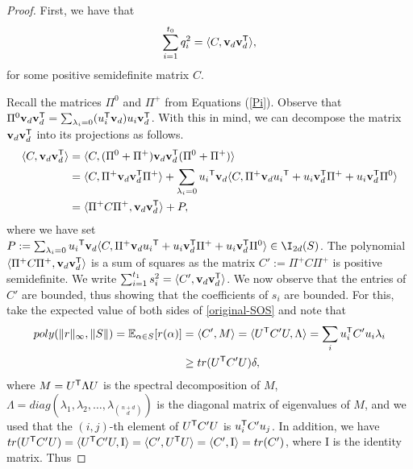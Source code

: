 \documentclass[11pt]{article}
\begin{document}
\begin{proof}
    First, we have that
    \begin{equation}
        \sum_{i=1}^{t_0} q_i^2 = \langle C, \mathbf{v}_d \mathbf{v}_d^{\sf{T}} \rangle,
    \end{equation}
    for some positive semidefinite matrix $C$.
    
    Recall the matrices $\Pi^0$ and $\Pi^+$ from Equations (\ref{Pi}). Observe that $\Pi^0 \mathbf{v}_d \mathbf{v}_d^{\sf{T}} = \sum_{\lambda_i = 0} (u_i^{\sf{T}} \mathbf{v}_d ) u_i \mathbf{v}_d^{\sf{T}}$. With this in mind, we can decompose the matrix $\mathbf{v}_d \mathbf{v}_d^{\sf{T}}$ into its projections as follows.
    \begin{align*}
        \langle C, \mathbf{v}_d \mathbf{v}_d^{\sf{T}} \rangle &= \langle C, (\Pi^0 + \Pi^+) \mathbf{v}_d \mathbf{v}_d^{\sf{T}} (\Pi^0 + \Pi^+) \rangle \\
        &= \langle C, \Pi^+ \mathbf{v}_d \mathbf{v}_d^{\sf{T}} \Pi^+ \rangle + \sum_{\lambda_i = 0} {u_i}^{\sf{T}} \mathbf{v}_d \langle C, \Pi^+ \mathbf{v}_d {u_i}^{\sf{T}} + {u_i} \mathbf{v}_d^{\sf{T}} \Pi^+ + {u_i} \mathbf{v}_d^{\sf{T}} \Pi^0 \rangle\\
        & = \langle \Pi^+ C \Pi^+, \mathbf{v}_d \mathbf{v}_d^{\sf{T}} \rangle + P,
    \end{align*}
    where we have set $P := \sum_{\lambda_i = 0} {u_i}^{\sf{T}} \mathbf{v}_d \langle C, \Pi^+ \mathbf{v}_d {u_i}^{\sf{T}} + {u_i} \mathbf{v}_d^{\sf{T}} \Pi^+ + {u_i} \mathbf{v}_d^{\sf{T}} \Pi^0 \rangle \in \I_{2d}(S)$. The polynomial $\langle \Pi^+ C \Pi^+, \mathbf{v}_d \mathbf{v}_d^{\sf{T}} \rangle$ is a sum of squares as the matrix $C':= \Pi^+ C \Pi^+$ is positive semidefinite. We write $\sum_{i=1}^{t_1}s_i^2 = \langle  C', \mathbf{v}_d \mathbf{v}_d^{\sf{T}} \rangle $. We now observe that the entries of $C'$ are bounded, thus showing that the coefficients of $s_i$ are bounded. For this, take the expected value of both sides of \eqref{original-SOS} and note that
    \begin{align*}
        poly(\| r \|_{\infty}, \| S \|)=\mathbb{E}_{\alpha \in S} [r(\alpha)] &= \langle C', M \rangle = \langle U^{\sf{T}} C' U, \Lambda \rangle = \sum_i u_i^{\sf{T}} C' u_i \lambda_i\\
        &\geq tr(U^{\sf{T}} C' U) \delta,
    \end{align*}
    where $M = U^{\sf{T}} \Lambda U$ is the spectral decomposition of $M$, $\Lambda = diag(\lambda_1, \lambda_2, \dots, \lambda_{\binom{n+d}{d}})$ is the diagonal matrix of eigenvalues of $M$, and we used that the $(i,j)$-th element of $U^{\sf{T}} C' U$ is $u_i^{\sf{T}} C' u_j$. In addition, we have $tr(U^{\sf{T}} C' U) = \langle U^{\sf{T}} C' U, \mathrm{I} \rangle = \langle C', U^{\sf{T}} U \rangle =  \langle C', \mathrm{I} \rangle = tr(C')$, where $\mathrm{I}$ is the identity matrix. Thus

\end{proof}
\end{document}
